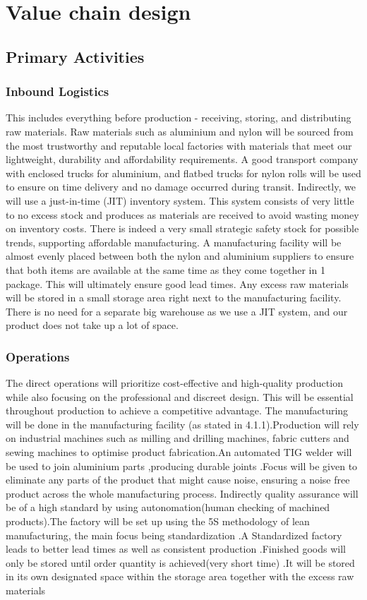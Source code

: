 \documentclass{article}
\begin{document}
\large
\section{Value chain design}
  \subsection{Primary Activities}
  \subsubsection{Inbound Logistics}
  This includes everything before production - receiving, storing, and distributing raw materials. Raw materials such as aluminium and nylon will be sourced from the most trustworthy and reputable local factories with materials that meet our lightweight, durability and affordability requirements. A good transport company with enclosed trucks for aluminium, and flatbed trucks for nylon rolls will be used to ensure on time delivery and no damage occurred during transit. Indirectly, we will use a just-in-time (JIT) inventory system. This system consists of very little to no excess stock and produces as materials are received to avoid wasting money on inventory costs. There is indeed a very small strategic safety stock for possible trends, supporting affordable manufacturing. A manufacturing facility will be almost evenly placed between both the nylon and aluminium suppliers to ensure that both items are available at the same time as they come together in 1 package. This will ultimately ensure good lead times. Any excess raw materials will be stored in a small storage area right next to the manufacturing facility. There is no need for a separate big warehouse as we use a JIT system, and our product does not take up a lot of space.
  \subsubsection{Operations}
  The direct operations will prioritize cost-effective and high-quality production while also focusing on the professional and discreet design. This will be essential throughout production to achieve a competitive advantage. The manufacturing will be done in the manufacturing facility (as stated in 4.1.1).Production will rely on industrial machines such as milling and drilling machines, fabric cutters and sewing machines to optimise product fabrication.An automated TIG welder will be used to join aluminium parts ,producing durable joints .Focus will be given to eliminate any parts of the product that might cause noise, ensuring a noise free product across the whole manufacturing process. Indirectly quality assurance will be of a high standard by using autonomation(human checking of machined products).The factory will be set up using the 5S methodology of lean manufacturing, the main focus being standardization .A Standardized factory leads to better lead times as well as consistent production .Finished goods will only be stored until order quantity is achieved(very short time) .It will be stored in its own designated space within the storage area together with the excess raw materials
\end{document}
